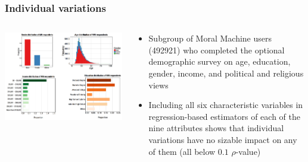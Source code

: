 \documentclass[aspectratio=169]{beamer}
\begin{document}
\begin{frame}
    \frametitle{Individual variations}
    \begin{columns}[totalwidth=1.0\textwidth]
        \begin{column}{0.6\linewidth}
            \includegraphics[width=1.0\linewidth]{assets/demographics-mme.png}
        \end{column}
        \begin{column}{0.4\linewidth}
            \begin{itemize}
                \item Subgroup of Moral Machine users (\num{492921}) who completed the optional demographic survey on age, education, gender, income, and political and religious views
                \item Including all six characteristic variables in regression-based estimators of each of the nine attributes shows that individual variations have no sizable impact on any of them (all below $0.1$ $\rho$-value)
            \end{itemize}
        \end{column}
    \end{columns}
\end{frame}
\end{document}
